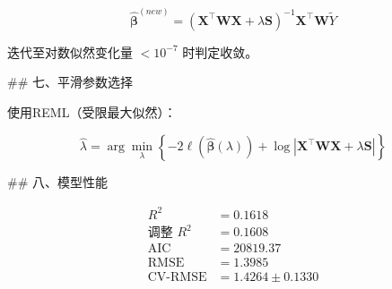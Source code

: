 \[
\hat{\boldsymbol{\beta}}^{(new)} = (\boldsymbol{X}^\top \boldsymbol{W} \boldsymbol{X} + \lambda \boldsymbol{S})^{-1} \boldsymbol{X}^\top \boldsymbol{W} \tilde{Y}
\]

迭代至对数似然变化量 \(< 10^{-7}\) 时判定收敛。

## 七、平滑参数选择

使用REML（受限最大似然）：

\[
\hat{\lambda} = \arg\min_{\lambda} \left\{ -2 \ell(\hat{\boldsymbol{\beta}}(\lambda)) + \log |\boldsymbol{X}^\top \boldsymbol{W} \boldsymbol{X} + \lambda \boldsymbol{S}| \right\}
\]

## 八、模型性能

\[
\begin{aligned}
R^2 &= 0.1618 \\
\text{调整 } R^2 &= 0.1608 \\
\text{AIC} &= 20819.37 \\
\text{RMSE} &= 1.3985 \\
\text{CV-RMSE} &= 1.4264 \pm 0.1330
\end{aligned}
\]

